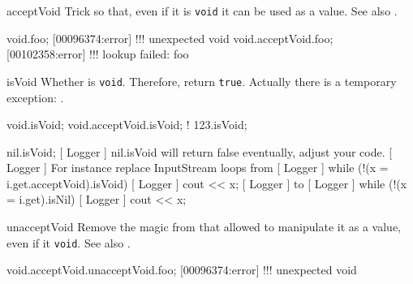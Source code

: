 \begin{urbiscriptapi}
\item[acceptVoid]%
  Trick \this so that, even if it is \lstinline|void| it can be used as a
  value.  See also .
\begin{urbiscript}
void.foo;
[00096374:error] !!! unexpected void
void.acceptVoid.foo;
[00102358:error] !!! lookup failed: foo
\end{urbiscript}

\item[isVoid]%
  Whether \this is \lstinline|void|.  Therefore, return \lstinline|true|.
  Actually there is a temporary exception: .
\begin{urbiassert}
void.isVoid;
void.acceptVoid.isVoid;
! 123.isVoid;

nil.isVoid;
[     Logger     ] nil.isVoid will return false eventually, adjust your code.
[     Logger     ]     For instance replace InputStream loops from
[     Logger     ]       while (!(x = i.get.acceptVoid).isVoid)
[     Logger     ]         cout << x;
[     Logger     ]     to
[     Logger     ]       while (!(x = i.get).isNil)
[     Logger     ]         cout << x;
\end{urbiassert}

\item[unacceptVoid]%
  Remove the magic from \this that allowed to manipulate it as a value, even
  if it \lstinline|void|.  See also .
\begin{urbiscript}
void.acceptVoid.unacceptVoid.foo;
[00096374:error] !!! unexpected void
\end{urbiscript}
\end{urbiscriptapi}




